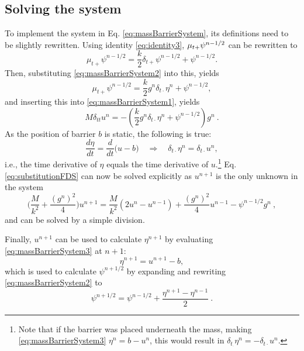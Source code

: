 \subsection{Solving the system}\label{sec:solvingMassBarrier}
To implement the system in Eq. \eqref{eq:massBarrierSystem}, its definitions need to be slightly rewritten. Using identity \eqref{eq:identity3}, $\mu_{t+} \psi^{n-1/2}$ can be rewritten to
\begin{equation*}
    \mu_{t+}\psi^{n-1/2} = \frac{k}{2}\delta_{t+}\psi^{n-1/2} + \psi^{n-1/2}.
\end{equation*}
Then, substituting \eqref{eq:massBarrierSystem2} into this, yields
\begin{equation}\nonumber
    \mu_{t+}\psi^{n-1/2} = \frac{k}{2}g^n\delta_{t\cdot}\eta^n + \psi^{n-1/2},
\end{equation}
and inserting this into \eqref{eq:massBarrierSystem1}, yields
\begin{equation}\label{eq:substitutionFDS}
    M\delta_{tt}u^n = -\left(\frac{k}{2}g^n\delta_{t\cdot}\eta^n + \psi^{n-1/2}\right)g^n\ .
\end{equation}
As the position of barrier $b$ is static, the following is true:
\begin{equation}\label{eq:derEtaEqDerU}
    \frac{d\eta}{dt} = \frac{d}{dt}\Big(u - b\Big)\quad \Longrightarrow \quad \delta_{t\cdot}\eta^n = \delta_{t\cdot}u^n,
\end{equation}
i.e., the time derivative of $\eta$ equals the time derivative of $u$.\footnote{Note that if the barrier was placed underneath the mass, making \eqref{eq:massBarrierSystem3} $\eta^n = b-u^n$, this would result in $\delta_{t_\cdot}\eta^n = -\delta_{t\cdot}u^n$.} Eq. \eqref{eq:substitutionFDS} can now be solved explicitly as $u^{n+1}$ is the only unknown in the system
\begin{equation}
    \bigg(\frac{M}{k^2} + \frac{(g^n)^2}{4}\bigg)u^{n+1} = \frac{M}{k^2}(2u^n-u^{n-1})+\frac{(g^n)^2}{4}u^{n-1}-\psi^{n-1/2}g^n\ ,
\end{equation}
and can be solved by a simple division. 

Finally, $u^{n+1}$ can be used to calculate $\eta^{n+1}$ by evaluating \eqref{eq:massBarrierSystem3} at $n+1$:
\begin{equation}\label{eq:etaNPlus1}
    \eta^{n+1} = u^{n+1}-b,
\end{equation}
which is used to calculate $\psi^{n+1/2}$ by expanding and rewriting \eqref{eq:massBarrierSystem2} to
\begin{equation}\label{eq:psiNPlusHalf}
    \psi^{n+1/2} = \psi^{n-1/2} + \frac{\eta^{n+1} - \eta^{n-1}}{2}\ .
\end{equation}

